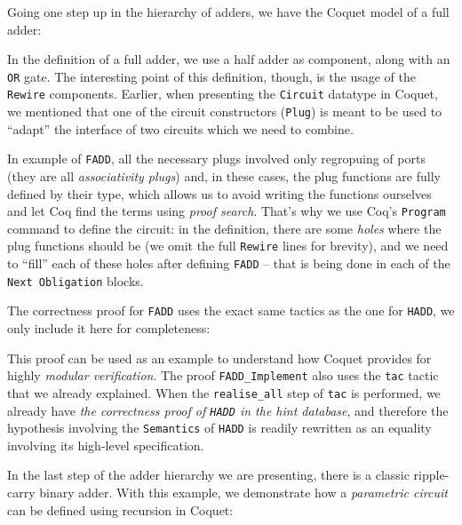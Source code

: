             Going one step up in the hierarchy of adders, we have the Coquet model of a full adder:


            In the definition of a full adder, we use a half adder as component, along with an
            \texttt{OR} gate. The interesting point of this definition, though, is the usage of the
            \texttt{Rewire} components. Earlier, when presenting the \texttt{Circuit} datatype in
            Coquet, we mentioned that one of the circuit constructors (\texttt{Plug}) is meant to be
            used to ``adapt'' the interface of two circuits which we need to combine.

            In example of \texttt{FADD}, all the necessary plugs involved only regropuing of ports
            (they are all \emph{associativity plugs}) and, in these cases, the plug functions are
            fully defined by their type, which allows us to avoid writing the functions ourselves
            and let Coq find the terms using \emph{proof search}. That's why we use Coq's
            \texttt{Program} command to define the circuit: in the definition, there are some
            \emph{holes} where the plug functions should be (we omit the full \texttt{Rewire} lines
            for brevity), and we need to ``fill'' each of these holes after defining \texttt{FADD}
            -- that is being done in each of the \texttt{Next Obligation} blocks.

            The correctness proof for \texttt{FADD} uses the exact same tactics as the one for
            \texttt{HADD}, we only include it here for completeness:


            This proof can be used as an example to understand how Coquet provides for highly
            \emph{modular verification}. The proof \texttt{FADD\_Implement} also uses the
            \texttt{tac} tactic that we already explained. When the \texttt{realise\_all} step of
            \texttt{tac} is performed, we already have \emph{the correctness proof of \texttt{HADD}
                in the hint database}, and therefore the hypothesis involving the \texttt{Semantics}
            of \texttt{HADD} is readily rewritten as an equality involving its high-level
            specification.

            In the last step of the adder hierarchy we are presenting, there is a classic
            ripple-carry binary adder. With this example, we demonstrate how a \emph{parametric
                circuit} can be defined using recursion in Coquet:

